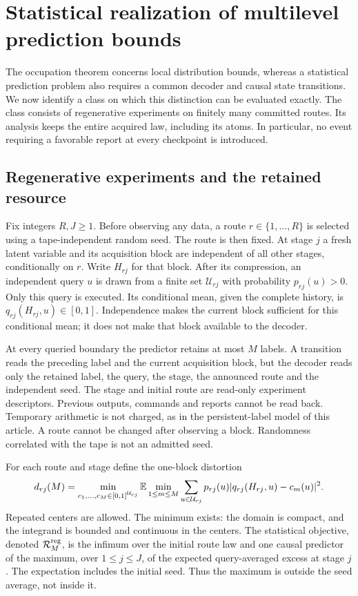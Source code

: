 \section{Statistical realization of multilevel prediction bounds}
\label{sec:v30-multilevel}
The occupation theorem concerns local distribution bounds, whereas a
statistical prediction problem also requires a common decoder and causal
state transitions. We now identify a class on which this distinction can
be evaluated exactly. The class consists of regenerative experiments on
finitely many committed routes. Its analysis keeps the entire acquired
law, including its atoms. In particular, no event requiring a favorable
report at every checkpoint is introduced.

\subsection{Regenerative experiments and the retained resource}
Fix integers $R,J\ge1$. Before observing any data, a route
$r\in\{1,\ldots,R\}$ is selected using a tape-independent random seed.
The route is then fixed. At stage $j$ a fresh latent variable and its
acquisition block are independent of all other stages, conditionally on
$r$. Write $H_{rj}$ for that block. After its compression, an independent
query $u$ is drawn from a finite set $\mathcal U_{rj}$ with probability
$p_{rj}(u)>0$. Only this query is executed. Its conditional mean, given
the complete history, is $q_{rj}(H_{rj},u)\in[0,1]$. Independence makes
the current block sufficient for this conditional mean; it does not
make that block available to the decoder.

At every queried boundary the predictor retains at most $M$ labels.
A transition reads the preceding label and the current acquisition
block, but the decoder reads only the retained label, the query, the
stage, the announced route and the independent seed. The stage and
initial route are read-only experiment descriptors. Previous outputs,
commands and reports cannot be read back. Temporary arithmetic is not
charged, as in the persistent-label model of this article. A route
cannot be changed after observing a block. Randomness correlated with
the tape is not an admitted seed.

For each route and stage define the one-block distortion
\begin{equation}\label{eq:v30-one-block}
 d_{rj}(M)=\min_{c_1,\ldots,c_M\in[0,1]^{\mathcal U_{rj}}}
 \mathbb E\min_{1\le m\le M}
       \sum_{u\in\mathcal U_{rj}}p_{rj}(u)
       |q_{rj}(H_{rj},u)-c_m(u)|^2.
\end{equation}
Repeated centers are allowed. The minimum exists: the domain is compact,
and the integrand is bounded and continuous in the centers. The
statistical objective, denoted $\mathcal R_M^{\rm reg}$, is the infimum
over the initial route law and one causal predictor of the maximum,
over $1\le j\le J$, of the expected query-averaged excess at stage $j$.
The expectation includes the initial seed. Thus the maximum is outside
the seed average, not inside it.

